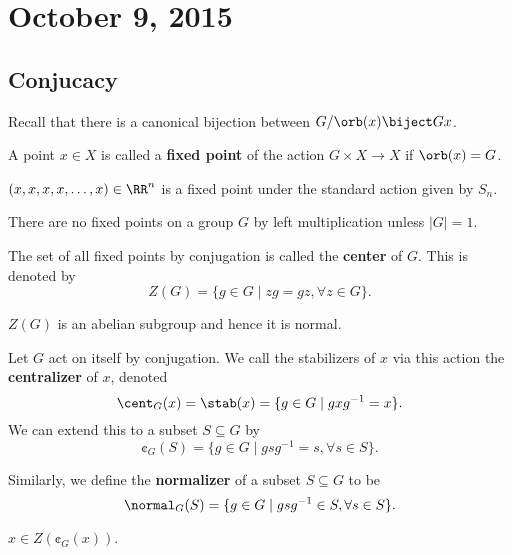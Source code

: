 \section{October 9, 2015}

\subsection{Conjucacy}
Recall that there is a canonical bijection between $G / \orb(x) \biject
Gx$.

\begin{df}
A point $x \in X$ is called a \textbf{fixed point} of the action $G
\times X \to X$ if $\orb(x) = G$.
\end{df}

\begin{ex}
$(x, x, x, x, \dots, x) \in \RR^n$ is a fixed point under the standard
action given by $S_n$.
\end{ex}

\begin{ex}
There are no fixed points on a group $G$ by left multiplication unless
$\lvert G \rvert = 1$.
\end{ex}

\begin{df}
The set of all fixed points by conjugation is called the \textbf{center}
of $G$. This is denoted by
\[ Z(G) = \lbrace g \in G \mid zg = gz, \forall z \in G \rbrace. \]
\end{df}

\begin{rem}
$Z(G)$ is an abelian subgroup and hence it is normal.
\end{rem}

\begin{df}
Let $G$ act on itself by conjugation. We call the stabilizers of $x$ via
this action the \textbf{centralizer} of $x$, denoted
\[ \cent_G(x) = \stab(x) = \lbrace g \in G \mid gxg^{-1} = x \rbrace. \]
We can extend this to a subset $S \subseteq G$ by
\[ \cent_G(S) = \lbrace g \in G \mid gsg^{-1} = s, \forall s \in S
\rbrace. \]
\end{df}

\begin{df}
Similarly, we define the \textbf{normalizer} of a subset $S \subseteq
G$ to be
\[ \normal_G(S) = \lbrace g \in G \mid gsg^{-1} \in S, \forall s \in S
\rbrace. \]
\end{df}

\begin{rem}
$x \in Z(\cent_G(x))$.
\end{rem}

